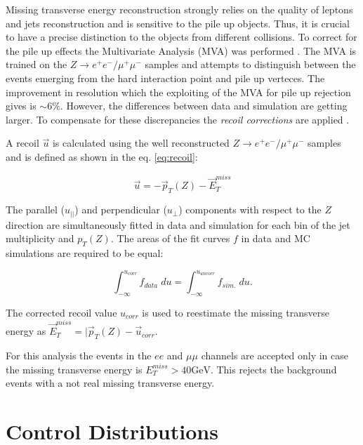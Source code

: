 Missing transverse energy reconstruction strongly relies on the quality of leptons and jets reconstruction and is sensitive to the pile up objects. Thus, it is
crucial to have a precise distinction to the objects from different collisions. To correct for the pile up effects the Multivariate Analysis (MVA) was performed \cite{CMS-PAS-JME-12-002}.
The MVA is trained on the $Z \to e^{+}e^{-} / \mu^{+}\mu^{-}$ samples and attempts to distinguish between the events emerging from the hard interaction point and
pile up verteces. The improvement in resolution which the exploiting of the MVA for pile up rejection gives is $\sim 6\%$. However, the differences between data
and simulation are getting larger. To compensate for these discrepancies the \textit{recoil corrections} are applied \cite{CMS-PAS-JME-12-002}. 

A recoil $\vec{u}$ is calculated using the well reconstructed $Z \to e^{+}e^{-} / \mu^{+}\mu^{-}$ samples and is defined as shown in the eq. \ref{eq:recoil}:

\begin{equation}
 \vec{u} = - \vec{p}_{T}(Z) - \vec{E}_{T}^{miss}
\end{equation}

The parallel ($u_{||}$) and perpendicular ($u_{\perp}$) components with respect to the $Z$ direction are simultaneously fitted in data and simulation for each bin
of the jet multiplicity and $p_{T}(Z)$. The areas of the fit curves $f$ in data and MC simulations are required to be equal:

\begin{equation}
 \int_{-\infty}^{u_{corr}} f_{data}\; du = \int_{-\infty}^{u_{uncorr}} f_{sim.}\; du.
\end{equation}

The corrected recoil value $u_{corr}$ is used to reestimate the missing transverse energy as $\vec{E}_{T}^{miss} = | \vec{p}_{T}(Z) - \vec{u}_{corr}$.

For this analysis the events in the $ee$ and $\mu\mu$ channels are accepted only in case the missing transverse energy is $E_{T}^{miss} > 40 \textrm{GeV}$. This rejects
the background events with a not real missing transverse energy.

\section{Control Distributions}
